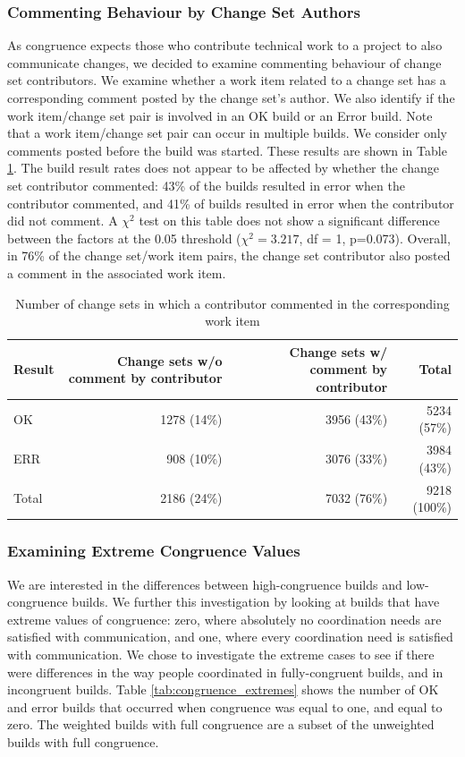 \subsubsection{Commenting Behaviour by Change Set Authors}
\label{sec:commenting}
As congruence expects those who contribute technical work to a project to also communicate changes, we decided to examine commenting behaviour of change set contributors.
We examine whether a work item related to a change set has a corresponding comment posted by the change set's author. We also identify if the work item/change set pair is involved in an OK build or an Error build. Note that a work item/change set pair can occur in multiple builds. We consider only comments posted before the build was started. These results are shown in Table \ref{tab:changesets_authors}.
The build result rates does not appear to be affected by whether the change set contributor commented: 43\% of the builds resulted in error when the contributor commented, and 41\% of builds resulted in error when the contributor did not comment. A $\chi^2$ test on this table does not show a significant difference between the factors at the 0.05 threshold ($\chi^2 = 3.217$, df = 1, {p=0.073}).
Overall, in 76\% of the change set/work item pairs, the change set contributor also posted a comment in the associated work item.
\begin{table}[t]
\centering
\begin{tabular}{lrrr}
Result & \parbox{0.715in}{\raggedright Change sets w/o comment by contributor\vspace{1pt}} & \parbox{0.715in}{\raggedright Change sets w/ comment by contributor\vspace{1pt}} & Total \\\hline 
OK		& 1278 (14\%) 	& 3956 (43\%) 	& 5234 (57\%) 	\\
ERR		& 908 (10\%) 	& 3076 (33\%)	& 3984 (43\%)	\\\hline
Total 	& 2186 (24\%) 	& 7032 (76\%) 	& 9218 (100\%)	\\
\end{tabular}
\caption{Number of change sets in which a contributor commented in the corresponding work item}
\label{tab:changesets_authors}
\end{table}

\subsubsection{Examining Extreme Congruence Values}
\label{sec:extremecongruence}
We are interested in the differences between high-congruence builds and low-congruence builds.
We further this investigation by looking at builds that have extreme values of congruence: zero, where absolutely no coordination needs are satisfied with communication, and one, where every coordination need is satisfied with communication.
We chose to investigate the extreme cases to see if there were differences in the way people coordinated in fully-congruent builds, and in incongruent builds.
Table \ref{tab:congruence_extremes} shows the number of OK and error builds that occurred when congruence was equal to one, and equal to zero. The weighted builds with full congruence are a subset of the unweighted builds with full congruence.


